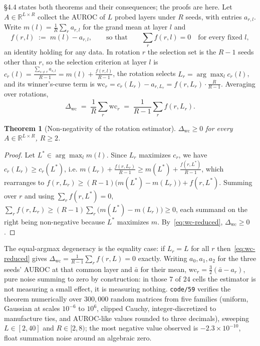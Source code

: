 \documentclass[10pt]{article} %
\newtheorem{theorem}{Theorem}
\begin{document}
§4.4 states both theorems and their consequences; the proofs are here. Let
$A\in\mathbb{R}^{L\times R}$ collect the AUROC of $L$ probed layers under $R$
seeds, with entries $a_{r,l}$. Write $m(l)=\tfrac{1}{R}\sum_r a_{r,l}$ for the
grand mean at layer $l$ and
%
\[
f(r,l)\;:=\;m(l)-a_{r,l},
\qquad\text{so that}\qquad
\sum_{r} f(r,l)=0 \quad\text{for every fixed } l,
\]
%
an identity holding for any data. In rotation $r$ the selection set is the
$R-1$ seeds other than $r$, so the selection criterion at layer $l$ is
$c_r(l)=\frac{\sum_{s\neq r} a_{s,l}}{R-1}=m(l)+\frac{f(r,l)}{R-1}$, the
rotation selects $L_r=\arg\max_l c_r(l)$, and its winner's-curse term is
$\text{wc}_r=c_r(L_r)-a_{r,L_r}=f(r,L_r)\cdot\tfrac{R}{R-1}$. Averaging over
rotations,
%
\begin{equation}
\Delta_{\text{wc}}
\;=\;\frac{1}{R}\sum_{r}\text{wc}_r
\;=\;\frac{1}{R-1}\sum_{r} f(r,L_r).
\label{eq:wc-reduced}
\end{equation}

\begin{theorem}[Non-negativity of the rotation estimator]
\label{thm:wc-nonneg}
$\Delta_{\text{wc}}\ge 0$ for every $A\in\mathbb{R}^{L\times R}$, $R\ge2$.
\end{theorem}

\begin{proof}
Let $L^{*}\in\arg\max_l m(l)$. Since $L_r$ maximizes $c_r$, we have
$c_r(L_r)\ge c_r(L^{*})$, i.e.
$m(L_r)+\tfrac{f(r,L_r)}{R-1}\ge m(L^{*})+\tfrac{f(r,L^{*})}{R-1}$, which
rearranges to
$f(r,L_r)\ge (R-1)\bigl(m(L^{*})-m(L_r)\bigr)+f(r,L^{*})$. Summing over $r$
and using $\sum_r f(r,L^{*})=0$,
$\sum_{r} f(r,L_r)\ge(R-1)\sum_{r}\bigl(m(L^{*})-m(L_r)\bigr)\ge 0$,
each summand on the right being non-negative because $L^{*}$ maximizes $m$.
By~\eqref{eq:wc-reduced}, $\Delta_{\text{wc}}\ge0$. \end{proof}

\noindent The equal-argmax degeneracy is the equality case: if $L_r=L$ for all
$r$ then~\eqref{eq:wc-reduced} gives
$\Delta_{\text{wc}}=\tfrac{1}{R-1}\sum_r f(r,L)=0$ exactly. Writing
$a_0,a_1,a_2$ for the three seeds' AUROC at that common layer and $\bar a$ for
their mean, $\text{wc}_r=\tfrac{3}{2}(\bar a - a_r)$, pure noise summing to
zero by construction: in those $7$ of $24$ cells the estimator is not measuring
a small effect, it is measuring nothing. \texttt{code/59} verifies the theorem
numerically over $300{,}000$ random matrices from five families (uniform,
Gaussian at scales $10^{-6}$ to $10^{6}$, clipped Cauchy, integer-discretized
to manufacture ties, and AUROC-like values rounded to three decimals), sweeping
$L\in[2,40]$ and $R\in[2,8)$; the most negative value observed is
$-2.3\times10^{-10}$, float summation noise around an algebraic zero.
\end{document}
